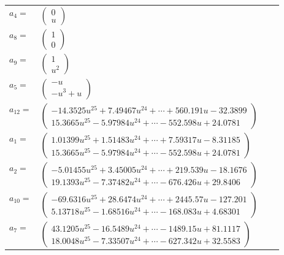 \documentclass[1p]{elsarticle_modified}
\theoremstyle{definition}
\begin{document}
\begin{tabular}{m{7pt} m{180pt} m{7pt} m{180pt} }
\flushright $a_{4}=$&$\begin{pmatrix}0\\u\end{pmatrix}$ \\
\flushright $a_{8}=$&$\begin{pmatrix}1\\0\end{pmatrix}$ \\
\flushright $a_{9}=$&$\begin{pmatrix}1\\u^2\end{pmatrix}$ \\
\flushright $a_{5}=$&$\begin{pmatrix}- u\\- u^3+u\end{pmatrix}$ \\
\flushright $a_{12}=$&$\begin{pmatrix}-14.3525 u^{25}+7.49467 u^{24}+\cdots+560.191 u-32.3899\\15.3665 u^{25}-5.97984 u^{24}+\cdots-552.598 u+24.0781\end{pmatrix}$ \\
\flushright $a_{1}=$&$\begin{pmatrix}1.01399 u^{25}+1.51483 u^{24}+\cdots+7.59317 u-8.31185\\15.3665 u^{25}-5.97984 u^{24}+\cdots-552.598 u+24.0781\end{pmatrix}$ \\
\flushright $a_{2}=$&$\begin{pmatrix}-5.01455 u^{25}+3.45005 u^{24}+\cdots+219.539 u-18.1676\\19.1393 u^{25}-7.37482 u^{24}+\cdots-676.426 u+29.8406\end{pmatrix}$ \\
\flushright $a_{10}=$&$\begin{pmatrix}-69.6316 u^{25}+28.6474 u^{24}+\cdots+2445.57 u-127.201\\5.13718 u^{25}-1.68516 u^{24}+\cdots-168.083 u+4.68301\end{pmatrix}$ \\
\flushright $a_{7}=$&$\begin{pmatrix}43.1205 u^{25}-16.5489 u^{24}+\cdots-1489.15 u+81.1117\\18.0048 u^{25}-7.33507 u^{24}+\cdots-627.342 u+32.5583\end{pmatrix}$ \\

\end{tabular}
\end{document}
